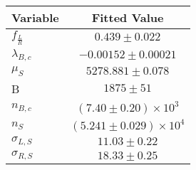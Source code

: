 \begin{tabular}[t]{lc}
\hline
Variable &Fitted Value\\
\hline\hline
$f_{\frac{L}{R}}$&$0.439\pm0.022$\\
\hline
$\lambda_{B,c}$&$-0.00152\pm0.00021$\\
\hline
$\mu_S$&$5278.881\pm0.078$\\
\hline
B&$1875\pm51$\\
\hline
$n_{B,c}$&$(7.40\pm0.20)\times 10^3$\\
\hline
$n_S$&$(5.241\pm0.029)\times 10^4$\\
\hline
$\sigma_{L, S}$&$11.03\pm0.22$\\
\hline
$\sigma_{R, S}$&$18.33\pm0.25$\\
\hline
\end{tabular}